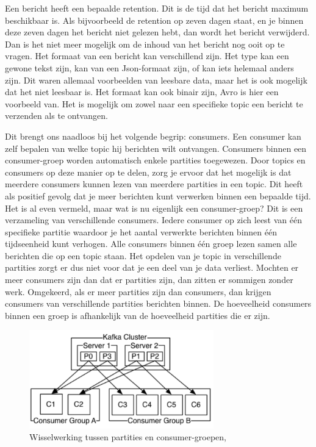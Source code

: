 Een bericht heeft een bepaalde retention. Dit is de tijd dat het bericht maximum beschikbaar is. Als bijvoorbeeld de retention op zeven dagen staat, en je binnen deze zeven dagen het bericht niet gelezen hebt, dan wordt het bericht verwijderd. Dan is het niet meer mogelijk om de inhoud van het bericht nog ooit op te vragen. Het formaat van een bericht kan verschillend zijn. Het type kan een gewone tekst zijn, kan van een Json-formaat zijn, of kan iets helemaal anders zijn. Dit waren allemaal voorbeelden van leesbare data, maar het is ook mogelijk dat het niet leesbaar is. Het formaat kan ook binair zijn, Avro is hier een voorbeeld van. Het is mogelijk om zowel naar een specifieke topic een bericht te verzenden als te ontvangen. 

Dit brengt ons naadloos bij het volgende begrip: consumers. Een consumer kan zelf bepalen van welke topic hij berichten wilt ontvangen. Consumers binnen een consumer-groep worden automatisch enkele partities toegewezen. Door topics en consumers op deze manier op te delen, zorg je ervoor dat het mogelijk is dat meerdere consumers kunnen lezen van meerdere partities in een topic. Dit heeft als positief gevolg dat je meer berichten kunt verwerken binnen een bepaalde tijd. Het is al even vermeld, maar wat is nu eigenlijk een consumer-groep? Dit is een verzameling van verschillende consumers. Iedere consumer op zich leest van één specifieke partitie waardoor je het aantal verwerkte berichten binnen één tijdseenheid kunt verhogen. Alle consumers binnen één groep lezen samen alle berichten die op een topic staan. Het opdelen van je topic in verschillende partities zorgt er dus niet voor dat je een deel van je data verliest. Mochten er meer consumers zijn dan dat er partities zijn, dan zitten er sommigen zonder werk. Omgekeerd, als er meer partities zijn dan consumers, dan krijgen consumers van verschillende partities berichten binnen. De hoeveelheid consumers binnen een groep is afhankelijk van de hoeveelheid partities die er zijn.

 \begin{figure}[h!]
    \centering
    \includegraphics[width=80mm]{../kafkaConsumers.png}
    \caption{Wisselwerking tussen partities en consumer-groepen, \autocite{Sookocheff2015}}
    
\end{figure}

